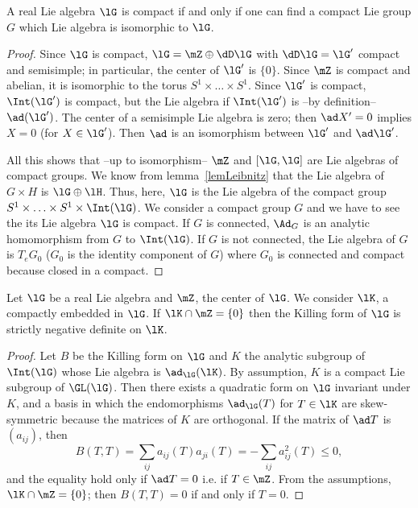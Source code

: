 \begin{proposition}
A real Lie algebra $\lG$ is compact if and only if one can find a compact Lie group $G$ which Lie algebra is isomorphic to $\lG$.
\label{prop:alg_grp_compact}
\end{proposition}

\begin{proof}
 Since $\lG$ is compact, $\lG=\mZ\oplus\dD\lG$ with $\dD\lG=\lG'$ compact and semisimple; in particular, the center of $\lG'$ is $\{0\}$. Since $\mZ$ is compact and abelian, it is isomorphic to the torus $S^1\times\ldots\times S^1$. Since $\lG'$ is compact, $\Int(\lG')$ is compact, but the Lie algebra if $\Int(\lG')$ is --by definition--  $\ad(\lG')$. The center of a semisimple Lie algebra is zero; then $\ad X'=0$ implies $X=0$ (for $X\in\lG'$). Then $\ad$ is an isomorphism between $\lG'$ and $\ad\lG'$.

All this shows that --up to isomorphism-- $\mZ$ and $[\lG,\lG]$ are Lie algebras of compact groups. We know from lemma~\ref{lemLeibnitz} that the Lie algebra of $G\times H$ is $\lG\oplus\lH$. Thus, here, $\lG$ is the Lie algebra of the compact group $S^1\times\ldots\times S^1\times\Int(\lG)$.
We consider a compact group $G$ and we have to see the its Lie algebra $\lG$ is compact. If $G$ is connected, $\Ad_G$ is an analytic homomorphism from $G$ to $\Int(\lG)$. If $G$ is not connected, the Lie algebra of $G$ is $T_eG_0$ ($G_0$ is the identity component of $G$) where $G_0$ is connected and compact because closed in a compact.
\end{proof}

\begin{proposition}
Let $\lG$ be a real Lie algebra and $\mZ$, the center of $\lG$. We consider $\lK$, a compactly embedded in $\lG$. If $\lK\cap\mZ=\{0\}$ then the Killing form of $\lG$ is strictly negative definite on $\lK$.
\label{prop:K_Z_Killing}
\end{proposition}

\begin{proof}
Let $B$ be the Killing form on $\lG$ and $K$ the analytic subgroup of $\Int(\lG)$ whose Lie algebra is $\ad_{\lG}(\lK)$. By assumption, $K$ is a compact Lie subgroup of $\GL(\lG)$. Then there exists a quadratic form on $\lG$ invariant under $K$, and a basis in which the endomorphisms $\ad_{\lG}(T)$ for $T\in\lK$ are skew-symmetric because the matrices of $K$ are orthogonal. If the matrix of $\ad T$ is $(a_{ij})$, then
\begin{equation}
   B(T,T)=\sum_{ij}a_{ij}(T)a_{ji}(T)
         =-\sum_{ij}a_{ij}^2(T)\leq 0,
\end{equation}
and the equality hold only if $\ad T=0$ i.e. if $T\in\mZ$. From the assumptions, $\lK\cap\mZ=\{0\}$; then $B(T,T)=0$ if and only if $T=0$.
\end{proof}


